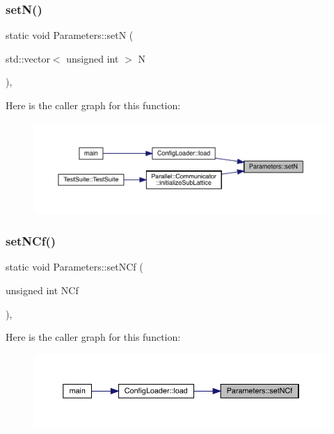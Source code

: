 \subsubsection{\texorpdfstring{setN()}{setN()}}
{\footnotesize\ttfamily static void Parameters\+::setN (\begin{DoxyParamCaption}\item[{std\+::vector$<$ unsigned int $>$}]{N }\end{DoxyParamCaption})\hspace{0.3cm}{\ttfamily [inline]}, {\ttfamily [static]}}

Here is the caller graph for this function\+:
\nopagebreak
\begin{figure}[H]
\begin{center}
\leavevmode
\includegraphics[width=350pt]{class_parameters_a0e0118ebbe8f19148a5c6d737c7a2c85_icgraph}
\end{center}
\end{figure}
\mbox{\label{class_parameters_a3c35caa5de4bb545a2b48af07e1756f3}} 
\subsubsection{\texorpdfstring{setNCf()}{setNCf()}}
{\footnotesize\ttfamily static void Parameters\+::set\+N\+Cf (\begin{DoxyParamCaption}\item[{unsigned int}]{N\+Cf }\end{DoxyParamCaption})\hspace{0.3cm}{\ttfamily [inline]}, {\ttfamily [static]}}

Here is the caller graph for this function\+:
\nopagebreak
\begin{figure}[H]
\begin{center}
\leavevmode
\includegraphics[width=350pt]{class_parameters_a3c35caa5de4bb545a2b48af07e1756f3_icgraph}
\end{center}
\end{figure}
\mbox{\label{class_parameters_afb3ef2dca9d24511a1904bc313fd8513}} 
